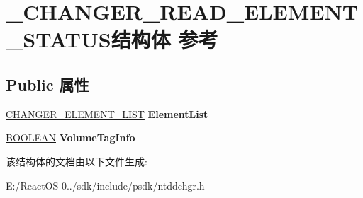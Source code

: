 \hypertarget{struct___c_h_a_n_g_e_r___r_e_a_d___e_l_e_m_e_n_t___s_t_a_t_u_s}{}\section{\+\_\+\+C\+H\+A\+N\+G\+E\+R\+\_\+\+R\+E\+A\+D\+\_\+\+E\+L\+E\+M\+E\+N\+T\+\_\+\+S\+T\+A\+T\+U\+S结构体 参考}
\label{struct___c_h_a_n_g_e_r___r_e_a_d___e_l_e_m_e_n_t___s_t_a_t_u_s}
\subsection*{Public 属性}
\begin{DoxyCompactItemize}
\item 
\mbox{\label{struct___c_h_a_n_g_e_r___r_e_a_d___e_l_e_m_e_n_t___s_t_a_t_u_s_ab0b4d8b0e97608f8911b7ca34f21e47a}} 
\hyperlink{struct___c_h_a_n_g_e_r___e_l_e_m_e_n_t___l_i_s_t}{C\+H\+A\+N\+G\+E\+R\+\_\+\+E\+L\+E\+M\+E\+N\+T\+\_\+\+L\+I\+ST} {\bfseries Element\+List}
\item 
\mbox{\label{struct___c_h_a_n_g_e_r___r_e_a_d___e_l_e_m_e_n_t___s_t_a_t_u_s_aa5b694f4115ce75592177d2e9e1b2223}} 
\hyperlink{_processor_bind_8h_a112e3146cb38b6ee95e64d85842e380a}{B\+O\+O\+L\+E\+AN} {\bfseries Volume\+Tag\+Info}
\end{DoxyCompactItemize}


该结构体的文档由以下文件生成\+:\begin{DoxyCompactItemize}
\item 
E\+:/\+React\+O\+S-\/0../sdk/include/psdk/ntddchgr.\+h\end{DoxyCompactItemize}
